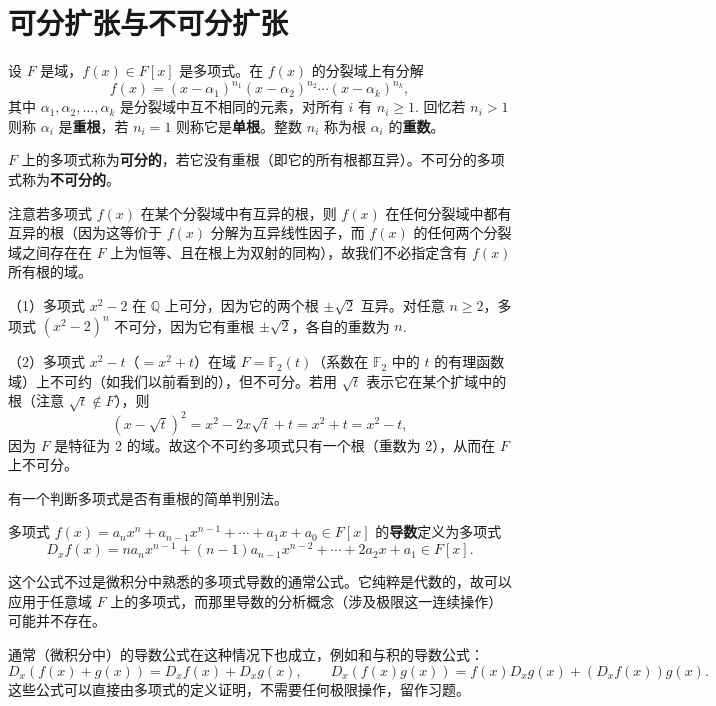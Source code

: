 \section{可分扩张与不可分扩张}

设 \(F\) 是域，\(f(x) \in F[x]\) 是多项式。在 \(f(x)\) 的分裂域上有分解
\[
f(x) = (x-\alpha_1)^{n_1}(x-\alpha_2)^{n_2}\cdots(x-\alpha_k)^{n_k},
\]
其中 \(\alpha_1, \alpha_2, \ldots, \alpha_k\) 是分裂域中互不相同的元素，对所有 \(i\) 有 \(n_i \geq 1\). 回忆若 \(n_i > 1\) 则称 \(\alpha_i\) 是\textbf{重根}，若 \(n_i = 1\) 则称它是\textbf{单根}。整数 \(n_i\) 称为根 \(\alpha_i\) 的\textbf{重数}。

\begin{definition}
\(F\) 上的多项式称为\textbf{可分的}，若它没有重根（即它的所有根都互异）。不可分的多项式称为\textbf{不可分的}。
\end{definition}

注意若多项式 \(f(x)\) 在某个分裂域中有互异的根，则 \(f(x)\) 在任何分裂域中都有互异的根（因为这等价于 \(f(x)\) 分解为互异线性因子，而 \(f(x)\) 的任何两个分裂域之间存在在 \(F\) 上为恒等、且在根上为双射的同构），故我们不必指定含有 \(f(x)\) 所有根的域。

\begin{example}
（1）多项式 \(x^2-2\) 在 \(\mathbb{Q}\) 上可分，因为它的两个根 \(\pm\sqrt{2}\) 互异。对任意 \(n \geq 2\)，多项式 \((x^2-2)^n\) 不可分，因为它有重根 \(\pm\sqrt{2}\)，各自的重数为 \(n\).

（2）多项式 \(x^2-t\)（\(= x^2+t\)）在域 \(F = \mathbb{F}_2(t)\)（系数在 \(\mathbb{F}_2\) 中的 \(t\) 的有理函数域）上不可约（如我们以前看到的），但不可分。若用 \(\sqrt{t}\) 表示它在某个扩域中的根（注意 \(\sqrt{t} \notin F\)），则
\[
(x-\sqrt{t})^2 = x^2-2x\sqrt{t}+t = x^2+t = x^2-t,
\]
因为 \(F\) 是特征为 2 的域。故这个不可约多项式只有一个根（重数为 2），从而在 \(F\) 上不可分。
\end{example}

有一个判断多项式是否有重根的简单判别法。

\begin{definition}
多项式 \(f(x) = a_nx^n+a_{n-1}x^{n-1}+\cdots+a_1x+a_0 \in F[x]\) 的\textbf{导数}定义为多项式
\[
D_xf(x) = na_nx^{n-1}+(n-1)a_{n-1}x^{n-2}+\cdots+2a_2x+a_1 \in F[x].
\]
\end{definition}

这个公式不过是微积分中熟悉的多项式导数的通常公式。它纯粹是代数的，故可以应用于任意域 \(F\) 上的多项式，而那里导数的分析概念（涉及极限这一连续操作）可能并不存在。

通常（微积分中）的导数公式在这种情况下也成立，例如和与积的导数公式：
\[
D_x(f(x)+g(x)) = D_xf(x)+D_xg(x), \qquad D_x(f(x)g(x)) = f(x)D_xg(x)+(D_xf(x))g(x).
\]
这些公式可以直接由多项式的定义证明，不需要任何极限操作，留作习题。

